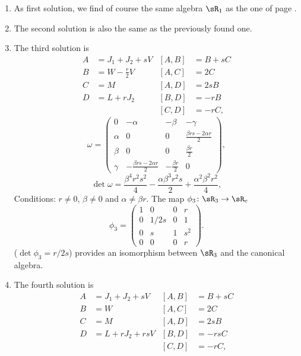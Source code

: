 \let\ANCtheenumi\theenumi
 \renewcommand{\theenumi}{\arabic{enumi}.}
\begin{enumerate}
\item As first solution, we find of course the same algebra $\sR_1$ as the one of page \pageref{PgAlgUn}.
\item The second solution is also the same as the previously found one.
\item The third solution is
\begin{align*}
A&=J_{1}+J_{2}+sV       &[A,B]&=B+sC\\
B&=W-\frac{ r }{2}V     &[A,C]&=2C\\
C&=M                &[A,D]&=2sB\\
D&=L+rJ_{2}         &[B,D]&=-rB\\
 &              &[C,D]&=-rC,
\end{align*}
\begin{equation}
\omega=\begin{pmatrix}
0   &-\alpha        &-\beta &-\gamma\\
\alpha  &0          &0  &\frac{ \beta rs-2\alpha r  }{ 2 }\\
\beta   &0          &0  &\frac{ \beta r }{2}\\
\gamma  &-\frac{ \beta rs-2\alpha r  }{ 2 } &-\frac{ \beta r }{2}   &0
\end{pmatrix},
\end{equation}
\[
  \det\omega=\frac{ \beta^{4}r^{2}s^{2} }{ 4 }-\frac{ \alpha\beta^{3}r^{2}s }{ 2 }+\frac{ \alpha^{2}\beta^{2}r^{2} }{ 4 },
\]
Conditions: $r\neq 0$, $\beta\neq 0$ and $\alpha\neq\beta r$. The map $\phi_3\colon \sR_3\to \sR_c$
\[
  \phi_3=
\begin{pmatrix}
1   &   0   &   0   &   r\\
0   &   1/2s    &   0   &   1\\
0   &   s   &   1   &   s^2\\
0   &   0   &   0   &   r
\end{pmatrix}.
\]
($\det\phi_3=r/2s$) provides an isomorphism between $\sR_3$ and the canonical algebra.
\item The fourth solution is
\begin{align*}
A&=J_{1}+J_{2}+sV       &[A,B]&=B+sC\\
B&=W                &[A,C]&=2C\\
C&=M                &[A,D]&=2sB\\
D&=L+rJ_{2}+rsV         &[B,D]&=-rsC\\
 &              &[C,D]&=-rC,
 \end{align*}

\end{enumerate}
